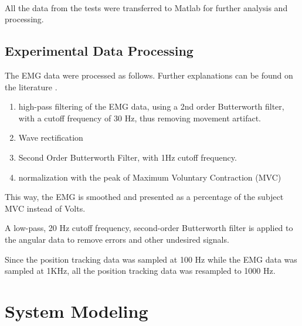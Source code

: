 \documentclass[letterpaper, 10 pt, conference]{ieeeconf}  %
\begin{document}
All the data from the tests were transferred to Matlab\textsuperscript{\textregistered} for further analysis and processing.


\subsection{Experimental Data Processing}

The EMG data were processed as follows. Further explanations can be found on the literature \cite{Rose20161112,Hayashibe20091621}.
\begin{enumerate}
\item high-pass filtering of the EMG data, using a 2nd order Butterworth filter, with a cutoff frequency of 30 Hz, thus removing movement artifact.
\item Wave rectification
\item Second Order Butterworth Filter, with 1Hz cutoff frequency.
\item normalization with the peak of Maximum Voluntary Contraction (MVC)
\end{enumerate}

This way, the EMG is smoothed and presented as a percentage of the subject MVC instead of Volts.

A low-pass, 20 Hz cutoff frequency, second-order Butterworth filter is applied to the angular data to remove errors and other undesired signals.

Since the position tracking data was sampled at 100 Hz while the EMG data was sampled at 1KHz, all the position tracking data was resampled to 1000 Hz.




\section{System Modeling}
\end{document}

